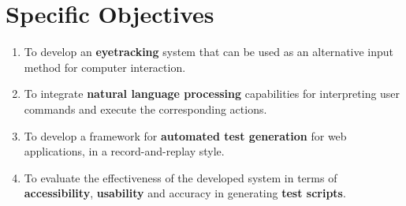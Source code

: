 \section{Specific Objectives}

\begin{enumerate}

\item To develop an \textbf{eyetracking} system that can be used as an alternative input method for computer interaction.

\item To integrate \textbf{natural language processing} capabilities for interpreting user commands and execute the corresponding actions.

\item To develop a framework for \textbf{automated test generation} for web applications, in a record-and-replay style.

\item To evaluate the effectiveness of the developed system in terms of \textbf{accessibility}, \textbf{usability} and accuracy in generating \textbf{test scripts}.


\end{enumerate}
